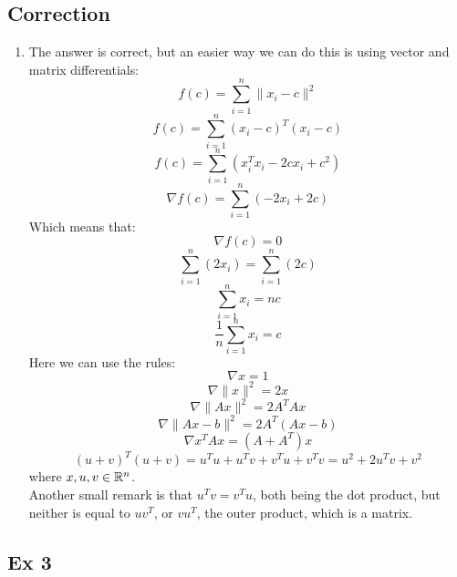\documentclass[12pt]{article}
\begin{document}
    \subsection*{Correction}
    \begin{enumerate}[label=\alph*)]
        \item
        The answer is correct,
        but an easier way we can do this is using
        vector and matrix differentials:
        \[ f(c) = \sum_{i=1}^{n}\|x_i - c\|^2 \]
        \[ f(c) = \sum_{i=1}^{n}(x_i - c)^T(x_i - c) \]
        \[ f(c) = \sum_{i=1}^{n}(x_i^Tx_i - 2cx_i + c^2) \]
        \[ \nabla f(c) 
        = \sum_{i=1}^{n}(- 2x_i + 2c) \]
        Which means that:
        \[ \nabla f(c) = 0 \]
        \[ \sum_{i=1}^{n}(2x_i) = \sum_{i=1}^{n}(2c) \]
        \[ \sum_{i=1}^{n}x_i = nc \]
        \[ \dfrac{1}{n}\sum_{i=1}^{n}x_i = c \]
        Here we can use the rules:
        \[ \nabla x = 1 \]
        \[ \nabla \| x \|^2 = 2x \]
        \[ \nabla \| Ax \|^2 = 2A^TAx \]
        \[ \nabla \| Ax -b \|^2 = 2A^T(Ax-b) \]
        \[ \nabla x^TAx = (A + A^T)x \]
        \[ (u + v)^T(u + v) 
        = u^Tu + u^Tv + v^Tu + v^Tv 
        = u^2 + 2u^Tv + v^2 \]
        where $x, u, v \in \mathbb{R}^n$. \\
        Another small remark is that $u^Tv = v^Tu$,
        both being the dot product,
        but neither is equal to $uv^T$,
        or $vu^T$,
        the outer product, which is a matrix.
    \end{enumerate}
    \endgroup

    \newpage

    \subsection*{Ex 3}
\end{document}
